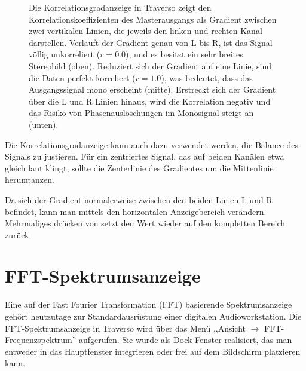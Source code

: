 \begin{figure}
	\centering
	\caption{Die Korrelationsgradanzeige in Traverso zeigt den Korrelationskoeffizienten des Masterausgangs als Gradient zwischen zwei vertikalen Linien, die jeweils den linken und rechten Kanal darstellen. Verläuft der Gradient genau von L bis R, ist das Signal völlig unkorreliert ($r = 0.0$), und es besitzt ein sehr breites Stereobild (oben). Reduziert sich der Gradient auf eine Linie, sind die Daten perfekt korreliert ($r = 1.0$), was bedeutet, dass das Ausgangssignal mono erscheint (mitte). Erstreckt sich der Gradient über die L und R Linien hinaus, wird die Korrelation negativ und das Risiko von Phasenauslöschungen im Monosignal steigt an (unten).}
	\label{fig_cmeter01}
\end{figure}

Die Korrelationsgradanzeige kann auch dazu verwendet werden, die Balance des Signals zu justieren. Für ein zentriertes Signal, das auf beiden Kanälen etwa gleich laut klingt, sollte die Zenterlinie des Gradientes um die Mittenlinie herumtanzen.

Da sich der Gradient normalerweise zwischen den beiden Linien L und R befindet, kann man mittels  den horizontalen Anzeigebereich verändern. Mehrmaliges drücken von  setzt den Wert wieder auf den kompletten Bereich zurück.

\section{FFT-Spektrumsanzeige}
Eine auf der Fast Fourier Transformation (FFT) basierende Spektrumsanzeige gehört heutzutage zur Standardausrüstung einer digitalen Audioworkstation. Die FFT-Spektrumsanzeige in Traverso wird über das Menü ,,Ansicht $\rightarrow$ FFT-Frequenzspektrum'' aufgerufen. Sie wurde als Dock-Fenster realisiert, das man entweder in das Hauptfenster integrieren oder frei auf dem Bildschirm platzieren kann.


